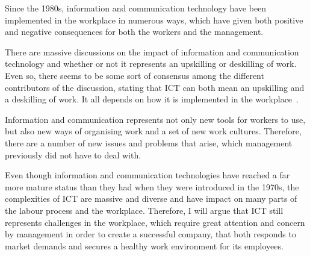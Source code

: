 \documentclass[a4paper,12pt,titlepage]{article}
\begin{document}
  Since the 1980s, information and communication technology have been
  implemented in the workplace in numerous ways, which have
  given both positive and negative consequences for both the workers
  and the management.

  There are massive discussions on the impact of 
  information and communication technology
  and whether or not it represents an upskilling or deskilling
  of work. Even so, there seems to be some sort of consensus
  among the different contributors of the discussion,
  stating that ICT can both mean an upskilling and
  a deskilling of work. It all depends on how it
  is implemented in the workplace~\cite[138]{jg}.

  Information and communication represents not only new tools for
  workers to use, but also new ways of organising
  work and a set of new work cultures. 
  Therefore, there are a number of new issues and problems
  that arise, which management previously did not have to deal with.

  Even though information and communication technologies have
  reached a far more mature status than they had when they
  were introduced in the 1970s, the complexities of ICT are massive and diverse
  and have impact on many parts of the labour process and the workplace.
  Therefore, I will argue that ICT still represents challenges in the workplace,
  which require great attention and concern by management in order to create
  a successful company, that both responds to market demands
  and secures a healthy work environment for its employees.

  \newpage
  \setlength{\baselineskip}{1.3em}
  
  
  \nocite{*}
\end{document}
